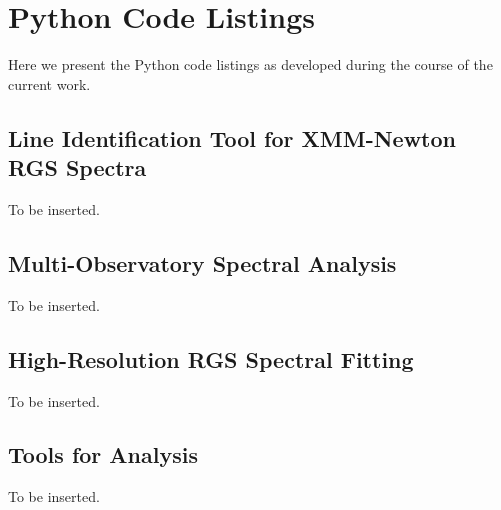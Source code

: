 \chapter{Python Code Listings} \label{appendix:code-listings}

	Here we present the Python code listings as developed during the course of the current work.

    \section{Line Identification Tool for XMM-Newton RGS Spectra}
    	To be inserted.
    	
    \section{Multi-Observatory Spectral Analysis}
    	To be inserted.
    	
    \section{High-Resolution RGS Spectral Fitting}
    	To be inserted.
    	
    \section{Tools for Analysis}
    	To be inserted.